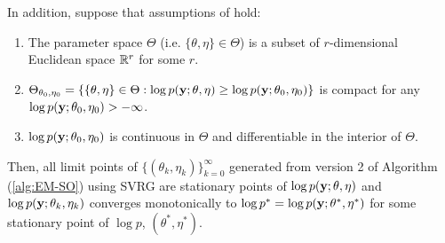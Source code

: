 \begin{theorem}
    In addition, suppose that assumptions of \citet{Wu:1983} hold:

    \begin{enumerate}
        \item The parameter space $\Theta$ (i.e. $\{\theta,\eta\} \in \Theta$) is a subset of $r$-dimensional Euclidean space $\mathbb{R}^r$ for some $r$.
        \item $\Theta_{\theta_0,\eta_0} = \{\{\theta,\eta\} \in \Theta: \log p(\mathbf{y};\theta,\eta) \geq \log p(\mathbf{y};\theta_0,\eta_0)\}$ is compact for any $\log p(\mathbf{y};\theta_0,\eta_0) > -\infty$.
        \item $\log p(\mathbf{y};\theta_0,\eta_0)$ is continuous in $\Theta$ and differentiable in the interior of $\Theta$.
    \end{enumerate}
    
    Then, all limit points of $\{(\theta_k,\eta_k)\}_{k=0}^\infty$ generated from version 2 of Algorithm (\ref{alg:EM-SO}) using SVRG are stationary points of $\log p(\mathbf{y};\theta,\eta)$ and $\log p(\mathbf{y};\theta_k,\eta_k)$ converges monotonically to $\log p^* = \log p(\mathbf{y};\theta^*,\eta^*)$ for some stationary point of $\log p$, $(\theta^*,\eta^*)$.
\end{theorem}
%




